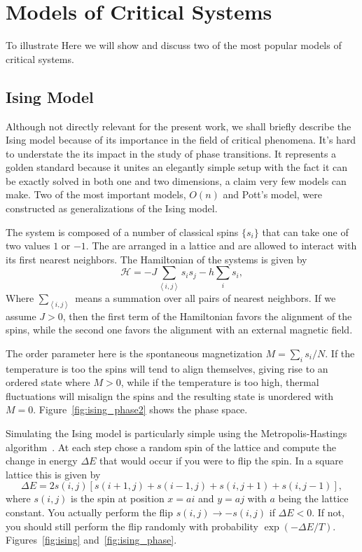\section{Models of Critical Systems}
\label{sec:models}

To illustrate 
Here we will show and discuss two of the most popular models of critical systems.

\subsection{Ising Model}
\label{sec:ising}

Although not directly relevant for the present work, we shall briefly describe
the Ising model because of its importance in the field of critical phenomena.
It's hard to understate the its impact in the study of phase transitions. It
represents a golden standard because it unites an elegantly simple setup with
the fact it can be exactly solved in both one and two dimensions, a claim very
few models can make. Two of the most important models, $O(n)$ and Pott's model,
were constructed as generalizations of the Ising model.

The system is composed of a number of classical spins $\{s_i\}$ that can take
one of two values $1$ or $-1$. The are arranged in a lattice and are allowed to
interact with its first nearest neighbors. The Hamiltonian of the systems is
given by
\begin{equation}
    \mathcal{H}=
    -J\sum_{\left\langle i,j\right\rangle }s_{i}s_{j}
    -h\sum_{i}s_{i},
\end{equation}
Where $\sum_{\left\langle i,j\right\rangle}$ means a summation over all pairs
of nearest neighbors. If we assume $J>0$, then the first term of the
Hamiltonian favors the alignment of the spins, while the second one 
favors the alignment with an external magnetic field.

The order parameter here is the spontaneous magnetization $M=\sum_i s_i / N$.
If the temperature is too the spins will tend to align themselves, giving rise
to an ordered state where $M>0$, while if the temperature is too high, thermal
fluctuations will misalign the spins and the resulting state is unordered
with $M=0$. Figure~\ref{fig:ising_phase2} shows the phase space.

Simulating the Ising model is particularly simple using the Metropolis-Hastings
algorithm~\cite{Hastings1970}. At each step chose a random spin of the lattice
and compute the change in energy $\Delta E$ that would occur if you were to
flip the spin. In a square lattice this is given by
\begin{equation}
    \Delta E=2s\left(i,j\right)\left[s\left(i+1,j\right)+
    s\left(i-1,j\right)+s\left(i,j+1\right)+s\left(i,j-1\right)\right],
\end{equation}
where $s(i,j)$ is the spin at position $x=ai$ and $y=aj$ with $a$ being the
lattice constant. You actually perform the flip $s(i,j)\rightarrow -s(i,j)$ if
$\Delta E < 0$. If not, you should still perform the flip randomly with
probability $\exp(-\Delta E / T)$. Figures~\ref{fig:ising}
and~\ref{fig:ising_phase}.

